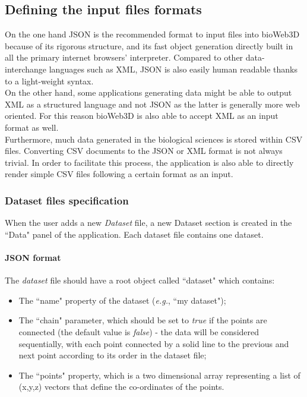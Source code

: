 \documentclass[10pt]{bmc_article}
\newenvironment{bmcformat}{\baselineskip20pt\sloppy\setboolean{publ}{false}}{\baselineskip20pt\sloppy}
\begin{document}
\begin{bmcformat}
\subsection{Defining the input files formats}
On the one hand JSON is the recommended format to input files into bioWeb3D because of its rigorous structure, and its fast object generation directly built in all the primary internet browsers' interpreter. Compared to other data-interchange languages such as XML, JSON is also easily human readable thanks to a light-weight syntax.\\
On the other hand, some applications generating data might be able to output XML as a structured language and not JSON as the latter is generally more web oriented. For this reason bioWeb3D is also able to accept XML as an input format as well.\\
Furthermore, much data generated in the biological sciences is stored within CSV files. Converting CSV documents to the JSON or XML format is not always trivial. In order to facilitate this process, the application is also able to directly render simple CSV files following a certain format as an input.


\subsubsection{Dataset files specification}
When the user adds a new {\it{Dataset}} file, a new Dataset section is created in the ``Data" panel of the application. Each dataset file contains one dataset.\\
\paragraph{JSON format}
The {\it{dataset}} file should have a root object called ``dataset" which contains: \begin{itemize}
\item{The ``name" property of the dataset (\textit{e.g.}, ``my dataset");}
\item{The ``chain" parameter, which should be set to \textit{true} if the points are connected (the default value is \textit{false}) - the data will be considered sequentially, with each point connected by a solid line to the previous and next point according to its order in the dataset file;}
\item{The ``points" property, which is a two dimensional array representing a list of (x,y,z) vectors that define the co-ordinates of the points.}
\end{itemize}


\end{bmcformat}
\end{document}
